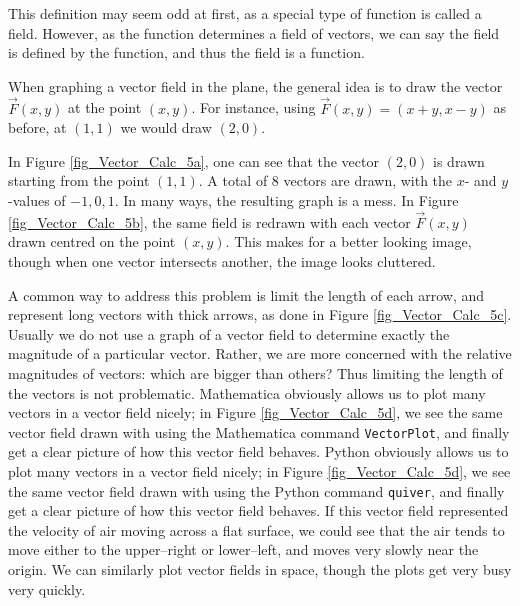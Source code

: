 This definition may seem odd at first, as a special type of function is called a field. However, as the function determines a field of vectors, we can say the field is defined by the function, and thus the field is a function.

 When graphing a vector field in the plane, the general idea is to draw the vector $\vec F(x,y)$ at the point $(x,y)$. For instance, using $\vec F(x,y) = \left( x+y,x-y\right)$ as before, at $(1,1)$ we would draw $\left( 2,0\right)$. 

In Figure \ref{fig_Vector_Calc_5a}, one can see that the vector $\left( 2,0\right)$ is drawn starting from the point $(1,1)$. A total of 8 vectors are drawn, with the $x$- and $y$-values of $-1,0,1$. In many ways, the resulting graph is a mess. In Figure \ref{fig_Vector_Calc_5b}, the same field is redrawn with each vector $\vec F(x,y)$ drawn centred on the point $(x,y)$. This makes for a better looking image, though when one vector intersects another, the image looks cluttered.

A common way to address this problem is limit the length of each arrow, and represent long vectors with thick arrows, as done in Figure \ref{fig_Vector_Calc_5c}. Usually we do not use a graph of a vector field to determine exactly the magnitude of a particular vector. Rather, we are more concerned with the relative magnitudes of vectors: which are bigger than others? Thus limiting the length of the vectors is not problematic.
\ifmathematica
Mathematica obviously allows us to plot many vectors in a vector field nicely; in Figure \ref{fig_Vector_Calc_5d}, we see the same vector field drawn with using the Mathematica command \lstinline{VectorPlot}, and finally get a clear picture of how this vector field behaves.\fi
\ifpython
Python obviously allows us to plot many vectors in a vector field nicely; in Figure \ref{fig_Vector_Calc_5d}, we see the same vector field drawn with using the Python command \lstinline{quiver}, and finally get a clear picture of how this vector field behaves.\fi
If this vector field represented the velocity of air moving across a flat surface, we could see that the air tends to move either to the upper--right or lower--left, and moves very slowly near the origin.  We can similarly plot vector fields in space, though the plots get very busy very quickly.


